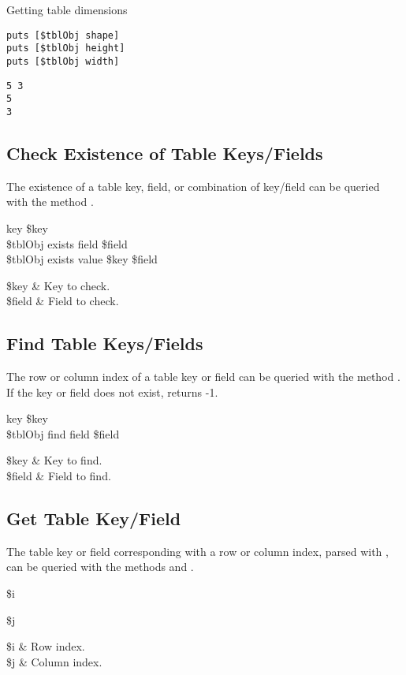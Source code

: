\begin{example}{Getting table dimensions}
\begin{lstlisting}
puts [$tblObj shape]
puts [$tblObj height]
puts [$tblObj width]
\end{lstlisting}
\tcblower
\begin{lstlisting}
5 3
5
3
\end{lstlisting}
\end{example}
\clearpage
\subsection{Check Existence of Table Keys/Fields}
The existence of a table key, field, or combination of key/field can be queried with the method . 
\begin{syntax}
 key \$key \\
\$tblObj exists field \$field \\
\$tblObj exists value \$key \$field
\end{syntax}
\begin{args}
\$key & Key to check. \\
\$field & Field to check.
\end{args}
\subsection{Find Table Keys/Fields}
The row or column index of a table key or field can be queried with the method . \\
If the key or field does not exist, returns -1.

\begin{syntax}
 key \$key \\
\$tblObj find field \$field
\end{syntax}
\begin{args}
\$key & Key to find. \\
\$field & Field to find.
\end{args}

\clearpage
\subsection{Get Table Key/Field}
The table key or field corresponding with a row or column index, parsed with , can be queried with the methods  and . 
\begin{syntax}
 \$i
\end{syntax}
\begin{syntax}
 \$j
\end{syntax}
\begin{args}
\$i & Row index. \\
\$j & Column index.
\end{args}
\clearpage
